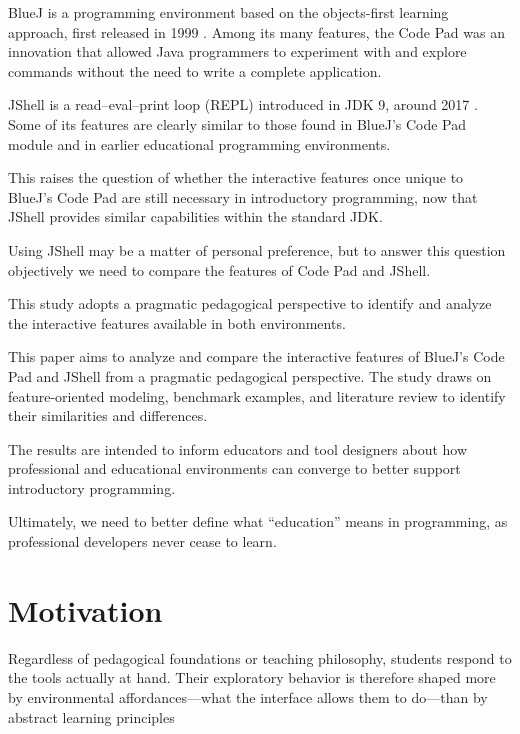 \documentclass{article}
\begin{document}
BlueJ is a programming environment based on the objects-first learning approach, first released in 1999 \cite{barnes2008objects}\cite{bluej_paper}. Among its many features, the Code Pad was an innovation that allowed Java programmers to experiment with and explore commands without the need to write a complete application.


JShell is a read–eval–print loop (REPL) introduced in JDK 9, around 2017 \cite{jshell_docs}. Some of its features are clearly similar to those found in BlueJ’s Code Pad module and in earlier educational programming environments.

This raises the question of whether the interactive features once unique to BlueJ’s Code Pad are still necessary in introductory programming, now that JShell provides similar capabilities within the standard JDK.


Using JShell may be a matter of personal preference, but to answer this question objectively we need to compare the features of Code Pad and JShell.

This study adopts a pragmatic pedagogical perspective to identify and analyze the interactive features available in both environments. 

This paper aims to analyze and compare the interactive features of BlueJ’s Code Pad and JShell from a pragmatic pedagogical perspective. The study draws on feature-oriented modeling, benchmark examples, and literature review to identify their similarities and differences.

The results are intended to inform educators and tool designers about how professional and educational environments can converge to better support introductory programming.

Ultimately, we need to better define what “education” means in programming, as professional developers never cease to learn.

\section{Motivation}

Regardless of pedagogical foundations or teaching philosophy, students respond to the tools actually at hand.
Their exploratory behavior is therefore shaped more by environmental affordances—what the interface allows them to do—than by abstract learning principles
\end{document}
